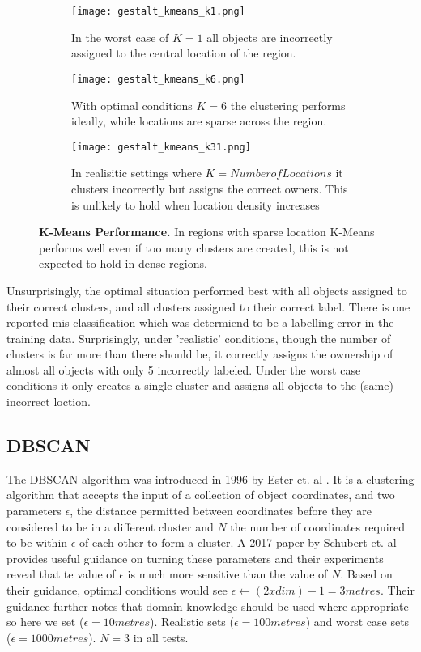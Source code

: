 \begin{figure*}[h]
\centering

\begin{subfigure}[t]{.3\textwidth}
\texttt{[image: gestalt\_kmeans\_k1.png]}
\caption{In the worst case of $K=1$ all objects are incorrectly assigned to the central location of the region.} %
\label{fig:kmeans_worst}
\end{subfigure}
\hfill
\begin{subfigure}[t]{.3\textwidth}
\texttt{[image: gestalt\_kmeans\_k6.png]}
\caption{\small With optimal conditions $K=6$ the clustering performs ideally, while locations are sparse across the region.}
\label{fig:kmeans_optimal}
\end{subfigure}
\hfill
\begin{subfigure}[t]{.3\textwidth}
\texttt{[image: gestalt\_kmeans\_k31.png]}
\caption{\small In realisitic settings where $K=Number of Locations$ it clusters incorrectly but assigns the correct owners. This is unlikely to hold when location density increases}
\label{fig:kmeans_realistic}
\hfill
\end{subfigure}

\caption{\textbf{K-Means Performance.} In regions with sparse location K-Means performs well even if too many clusters are created, this is not expected to hold in dense regions.}

\label{fig:kmeans_experiments}
\end{figure*}

Unsurprisingly, the optimal situation performed best with all objects assigned to their correct clusters, and all clusters assigned to their correct label. There is one reported mis-classification which was determiend to be a labelling error in the training data. Surprisingly, under 'realistic' conditions, though the number of clusters is far more than there should be, it correctly assigns the ownership of almost all objects with only 5 incorrectly labeled. Under the worst case conditions it only creates a single cluster and assigns all objects to the (same) incorrect loction. 

\subsection{DBSCAN}
The DBSCAN algorithm was introduced in 1996 by Ester et. al \cite{Ester1996}. It is a clustering algorithm that accepts the input of a collection of object coordinates, and two parameters $\epsilon$, the distance permitted between coordinates before they are considered to be in a different cluster and $N$ the number of coordinates required to be within $\epsilon$ of each other to form a cluster. 
A 2017 paper by Schubert et. al\cite{Schubert2017} provides useful guidance on turning these parameters and their experiments reveal that te value of $\epsilon$ is much more sensitive than the value of $N$. Based on their guidance, optimal conditions would see $\epsilon \leftarrow (2xdim)-1 = 3metres$. Their guidance further notes that domain knowledge should be used where appropriate so here we set ($\epsilon = 10 metres$). Realistic sets ($\epsilon = 100 metres$) and worst case sets ($\epsilon = 1000 metres$). $N=3$ in all tests. 

